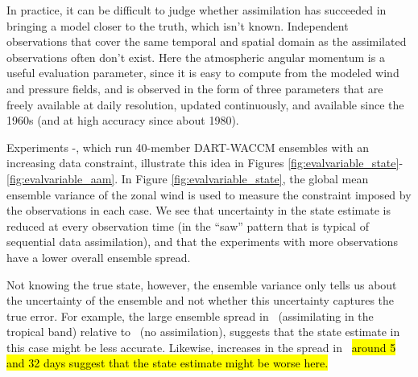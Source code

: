 In practice, it can be difficult to judge whether assimilation has succeeded in bringing a model closer to the truth, which isn't known. 
Independent observations that cover the same temporal and spatial domain as the assimilated observations often don't exist. 
Here the atmospheric angular momentum is a useful evaluation parameter, since it is easy to compute from the modeled wind and pressure fields, and is observed in the form of three parameters that are freely available at daily resolution, updated continuously, and available since the 1960s (and at high accuracy since about 1980).  

Experiments \WACCMNODA-\WACCMGLOBAL, which run 40-member DART-WACCM ensembles with an increasing data constraint, illustrate this idea in Figures \ref{fig:evalvariable_state}-\ref{fig:evalvariable_aam}.   
In Figure \ref{fig:evalvariable_state}, the global mean ensemble variance of the zonal wind is used to measure the constraint imposed by the observations in each case.
We see that uncertainty in the state estimate is reduced at every observation time (in the ``saw'' pattern that is typical of sequential data assimilation), and that the experiments with more observations have a lower overall ensemble spread. 

Not knowing the true state, however, the ensemble variance only tells us about the uncertainty of the ensemble and not whether this uncertainty captures the true error. 
For example, the large ensemble spread in \WACCMTROPICS~(assimilating in the tropical band) relative to \WACCMNODA~(no assimilation), suggests that the state estimate in this case might be less accurate. 
Likewise, increases in the spread in \WACCMGLOBAL~\hl{around 5 and 32 days suggest that the state estimate might be worse here.}

